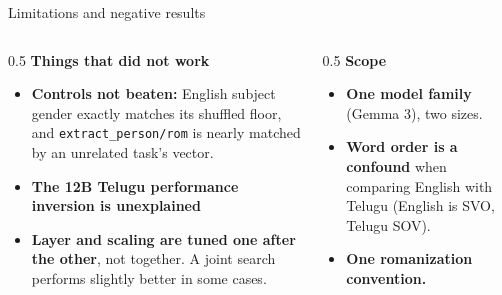 \documentclass[aspectratio=169,11pt]{beamer}
\newcommand{\tight}{\setlength{\itemsep}{2pt plus 1pt minus 1pt}}
\begin{document}
\begin{frame}{Limitations and negative results}
  \begin{columns}[T]
    \begin{column}{0.5\textwidth}
      \textbf{Things that did not work}
      \begin{itemize}\footnotesize\tight
        \item \textbf{Controls not beaten:} English subject
              gender exactly matches its shuffled floor, and
              \texttt{extract\_person/rom} is nearly matched by an unrelated
              task's vector.
        \item \textbf{The 12B Telugu performance inversion is unexplained}
        \item \textbf{Layer and scaling are tuned one after the other}, not
              together. A joint search performs slightly better in some cases.
      \end{itemize}
    \end{column}
    \begin{column}{0.5\textwidth}
      \textbf{Scope}
      \begin{itemize}\footnotesize\tight
        \item \textbf{One model family} (Gemma 3), two sizes.
        \item \textbf{Word order is a confound} when comparing English with
              Telugu (English is SVO, Telugu SOV).
        \item \textbf{One romanization convention.}
      \end{itemize}
    \end{column}
  \end{columns}
\end{frame}
\end{document}
